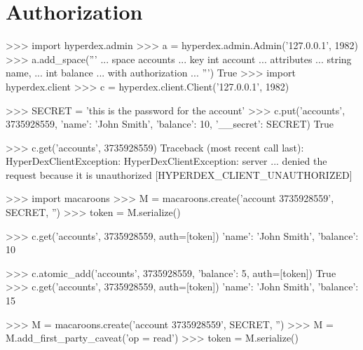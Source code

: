 \chapter{Authorization}
\label{chap:auth}

\begin{pythoncode}
>>> import hyperdex.admin
>>> a = hyperdex.admin.Admin('127.0.0.1', 1982)
>>> a.add_space('''
... space accounts
... key int account
... attributes
...    string name,
...    int balance
... with authorization
... ''')
True
>>> import hyperdex.client
>>> c = hyperdex.client.Client('127.0.0.1', 1982)
\end{pythoncode}

\begin{pythoncode}
>>> SECRET = 'this is the password for the account'
>>> c.put('accounts', 3735928559, {'name': 'John Smith', 'balance': 10, '__secret': SECRET})
True
\end{pythoncode}

\begin{pythoncode}
>>> c.get('accounts', 3735928559)
Traceback (most recent call last):
HyperDexClientException: HyperDexClientException: server ... denied the request because it is unauthorized [HYPERDEX_CLIENT_UNAUTHORIZED]
\end{pythoncode}


\begin{pythoncode}
>>> import macaroons
>>> M = macaroons.create('account 3735928559', SECRET, '')
>>> token = M.serialize()
\end{pythoncode}

\begin{pythoncode}
>>> c.get('accounts', 3735928559, auth=[token])
{'name': 'John Smith', 'balance': 10}
\end{pythoncode}

\begin{pythoncode}
>>> c.atomic_add('accounts', 3735928559, {'balance': 5}, auth=[token])
True
>>> c.get('accounts', 3735928559, auth=[token])
{'name': 'John Smith', 'balance': 15}
\end{pythoncode}

\begin{pythoncode}
>>> M = macaroons.create('account 3735928559', SECRET, '')
>>> M = M.add_first_party_caveat('op = read')
>>> token = M.serialize()
\end{pythoncode}

